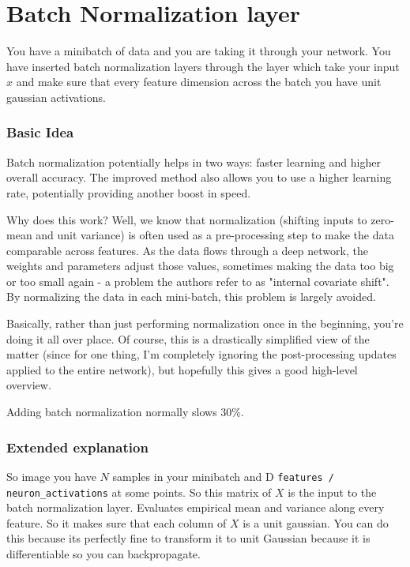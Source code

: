 \chapter{Batch Normalization layer}

You have a minibatch of data and you are taking it through your network. You have inserted batch normalization layers through the layer which take your input $x$ and make sure that every feature dimension across the batch you have unit gaussian activations.

\subsection*{Basic Idea}

Batch normalization potentially helps in two ways: faster learning and higher overall accuracy. The improved method also allows you to use a higher learning rate, potentially providing another boost in speed.

Why does this work? Well, we know that normalization (shifting inputs to zero-mean and unit variance) is often used as a pre-processing step to make the data comparable across features. As the data flows through a deep network, the weights and parameters adjust those values, sometimes making the data too big or too small again - a problem the authors refer to as "internal covariate shift". By normalizing the data in each mini-batch, this problem is largely avoided.

Basically, rather than just performing normalization once in the beginning, you're doing it all over place. Of course, this is a drastically simplified view of the matter (since for one thing, I'm completely ignoring the post-processing updates applied to the entire network), but hopefully this gives a good high-level overview.

Adding batch normalization normally slows 30\%.

\subsection*{Extended explanation}

So image you have $N$ samples in your minibatch and D \texttt{features / neuron\_activations} at some points. So this matrix of $X$ is the input to the batch normalization layer. Evaluates empirical mean and variance along every feature. So it makes sure that each column of $X$ is a unit gaussian. You can do this because its perfectly fine to transform it to unit Gaussian because it is differentiable so  you can backpropagate.

